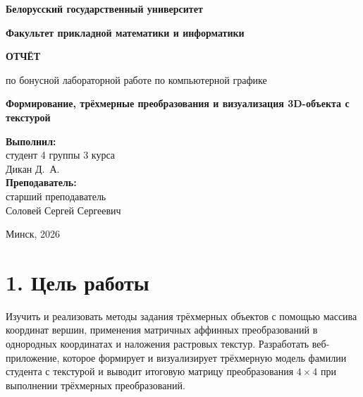 \documentclass[11pt,a4paper]{article}
\begin{document}
\begin{titlepage}
    \centering
    {\bfseries\large Белорусский государственный университет\par}
    {\bfseries\large Факультет прикладной математики и информатики\par}
    
    \vspace{6cm}
    {\Huge\bfseries ОТЧЁТ\par}
    \vspace{0.5cm}
    {\large по бонусной лабораторной работе по компьютерной графике\par}
    \vspace{0.5cm}
    {\Large\bfseries Формирование, трёхмерные преобразования и визуализация 3D-объекта с текстурой\par}
    
    \vspace{6cm}
    \begin{flushright}
        \large
        \textbf{Выполнил:}\\
        студент 4 группы 3 курса\\
        Дикан Д.~А.\\[1em]
        \textbf{Преподаватель:}\\
        старший преподаватель\\
        Соловей Сергей Сергеевич
    \end{flushright}
    
    \vfill
    {\large Минск, 2026\par}
\end{titlepage}

\newpage

\section*{1. Цель работы}
Изучить и реализовать методы задания трёхмерных объектов с помощью массива координат вершин, применения матричных аффинных преобразований в однородных координатах и наложения растровых текстур. Разработать веб-приложение, которое формирует и визуализирует трёхмерную модель фамилии студента с текстурой и выводит итоговую матрицу преобразования $4 \times 4$ при выполнении трёхмерных преобразований.
\end{document}
